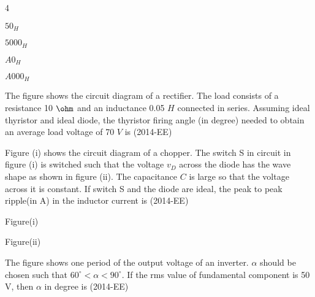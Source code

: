 	\begin{enumerate}

\end{enumerate}

\item The figure shows the circuit diagram of a rectifier. The load consists of a resistance 10 $\ohm$ and an
inductance 0.05 $H$ connected in series. Assuming ideal thyristor and ideal diode, the thyristor
firing angle (in degree) needed to obtain an average load voltage of 70 $V$ is \underline{\hspace{2.5 cm}}  \hfill{(2014-EE)}

\begin{center}

\end{center}




\item Figure (i) shows the circuit diagram of a chopper. The switch S in circuit in figure (i) is switched such that the voltage $v_D$ across the diode has the wave shape as shown in figure (ii). The capacitance $C$ is large so that the voltage across it is constant. If switch S and the diode are ideal, the peak to peak ripple(in A) in the inductor current is  \underline{\hspace{2.5 cm}}    \hfill{(2014-EE)} 
         
\begin{center}

Figure(i)
\end{center}

\begin{center}

Figure(ii)
\end{center}


\item The figure shows one period of the output voltage of an inverter. $\alpha$ should be chosen such that $60 ^{\circ} < \alpha<90^{\circ}$. If the rms value of fundamental component is 50 V, then $\alpha$ in degree  is \underline{\hspace{2.5 cm}}  \hfill{(2014-EE)}

\begin{center}

\end{center}

